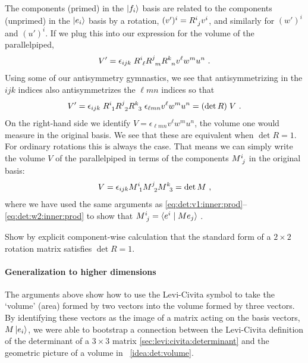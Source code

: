 The components (primed) in the $\left|f_i\right\rangle$ basis are related to the components (unprimed) in the $\left|e_i\right\rangle$ basis by a rotation, $(v')^i=R\aij{i}{j}v^i$, and similarly for $(w')^i$ and $(u')^i$. If we plug this into our expression for the volume of the parallelpiped,
\begin{align}
    V' = \epsilon_{ijk}\; 
    R\aij{i}{\ell}
    R\aij{j}{m}
    R\aij{k}{n}
    v^\ell w^m u^n \ .
\end{align}
Using some of our antisymmetry gymnastics, we see that antisymmetrizing in the $ijk$ indices also antisymmetrizes the $\ell m n$ indices so that
\begin{align}
    V' = \epsilon_{ijk}\; 
    R\aij{i}{1}
    R\aij{j}{2}
    R\aij{k}{3}\;
    \epsilon_{\ell m n}
    v^\ell w^m u^n 
    =
    (\det R)\; V
    \ .
\end{align}
On the right-hand side we identify $V=\epsilon_{\ell m n} v^\ell w^m u^n $, the volume one would measure in the original basis. We see that these are equivalent when $\det R = 1$. For ordinary rotations this is always the case. That means we can simply write the volume $V$ of the parallelpiped in terms of the components $M\aij{i}{j}$ in the original basis:
\begin{align}
    V = \epsilon_{ijk}
    M\aij{i}{1}
    M\aij{j}{2}
    M\aij{k}{3}
    = \det M \ ,
\end{align}
where we have used the same arguments as \eqref{eq:det:v1:inner:prod}--\eqref{eq:det:w2:inner:prod} to show that $M\aij{i}{j} = \la e^i \mid M e_j \ra $ . 

\begin{exercise}
Show by explicit component-wise calculation that the standard form of a $2\times 2$ rotation matrix satisfies $\det R = 1$. 
\end{exercise}

\paragraph{Generalization to higher dimensions}

The arguments above show how to use the Levi-Civita symbol to take the `volume' (area) formed by two vectors into the volume formed by three vectors. By identifying these vectors as the image of a matrix acting on the basis vectors, $M\left|e_i\right\rangle$, we were able to bootstrap a connection between the Levi-Civita definition of the determinant of a $3\times 3$ matrix \eqref{sec:levi:civita:determinant} and the geometric picture of a volume in \bigidearef{}~\ref{idea:det:volume}.

